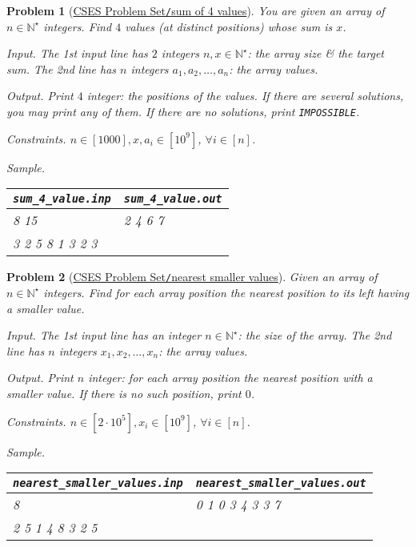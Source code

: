 \documentclass{article}
\newtheorem{problem}{Problem}
\begin{document}
\begin{problem}[\href{https://cses.fi/problemset/task/1642}{CSES Problem Set{\tt/}sum of 4 values}]
    You are given an array of $n\in\mathbb{N}^\star$ integers. Find $4$ values (at distinct positions) whose sum is $x$.
    \item {\sf Input.} The 1st input line has $2$ integers $n,x\in\mathbb{N}^\star$: the array size \& the target sum. The 2nd line has $n$ integers $a_1,a_2,\ldots,a_n$: the array values.
    \item {\sf Output.} Print $4$ integer: the positions of the values. If there are several solutions, you may print any of them. If there are no solutions, print {\tt IMPOSSIBLE}.
    \item {\sf Constraints.} $n\in[1000],x,a_i\in[10^9]$, $\forall i\in[n]$.
    \item {\sf Sample.}
    \begin{table}[H]
        \centering
        \begin{tabular}{|l|l|}
            \hline
            \verb|sum_4_value.inp| & \verb|sum_4_value.out| \\
            \hline
            8 15 & 2 4 6 7 \\
            3 2 5 8 1 3 2 3 & \\
            \hline
        \end{tabular}
    \end{table}
\end{problem}

\begin{problem}[\href{https://cses.fi/problemset/task/1645}{CSES Problem Set{\tt/}nearest smaller values}]
    Given an array of $n\in\mathbb{N}^\star$ integers. Find for each array position the nearest position to its left having a smaller value.
    \item {\sf Input.} The 1st input line has an integer $n\in\mathbb{N}^\star$: the size of the array. The 2nd line has $n$ integers $x_1,x_2,\ldots,x_n$: the array values.
    \item {\sf Output.} Print $n$ integer: for each array position the nearest position with a smaller value. If there is no such position, print $0$.
    \item {\sf Constraints.} $n\in[2\cdot10^5],x_i\in[10^9]$, $\forall i\in[n]$.
    \item {\sf Sample.}
    \begin{table}[H]
        \centering
        \begin{tabular}{|l|l|}
            \hline
            \verb|nearest_smaller_values.inp| & \verb|nearest_smaller_values.out| \\
            \hline
            8 & 0 1 0 3 4 3 3 7 \\
            2 5 1 4 8 3 2 5 & \\
            \hline
        \end{tabular}
    \end{table}
\end{problem}
\end{document}
